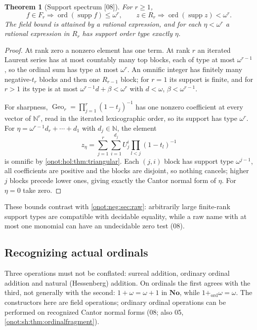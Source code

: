\documentclass[11pt,oneside]{article}
\numberwithin{equation}{section}
\newtheorem{theorem}{Theorem}[section]
\theoremstyle{definition}
\theoremstyle{remark}
\newcommand{\No}{\mathbf{No}}
\newcommand{\N}{\mathbb N}
\newcommand{\supp}{\operatorname{supp}}
\newcommand{\ord}{\operatorname{ord}}
\newcommand{\Geo}{\operatorname{Geo}}
\newcommand{\src}[1]{\textup{\textsf{\small[#1]}}}
\begin{document}
\begin{theorem}[Support spectrum \src{08}]\label{onot:hol:thm:support}
For $r\ge1$,
\[
 f\in F_r\Rightarrow\ord(\supp f)\le\omega^r,\qquad z\in R_r\Rightarrow\ord(\supp z)<\omega^r.
\]
The field bound is attained by a rational expression, and for each
$\eta<\omega^r$ a rational expression in $R_r$ has support order type exactly
$\eta$.
\end{theorem}
\begin{proof}
At rank zero a nonzero element has one term. At rank $r$ an iterated Laurent
series has at most countably many top blocks, each of type at most
$\omega^{r-1}$, so the ordinal sum has type at most $\omega^r$. An omnific
integer has finitely many negative-$t_r$ blocks and then one $R_{r-1}$ block; for
$r=1$ its support is finite, and for $r>1$ its type is at most
$\omega^{r-1}d+\beta<\omega^r$ with $d<\omega$, $\beta<\omega^{r-1}$.

For sharpness, $\Geo_r=\prod_{j=1}^r(1-t_j)^{-1}$ has one nonzero coefficient at
every vector of $\N^r$, read in the iterated lexicographic order, so its support
has type $\omega^r$. For $\eta=\omega^{r-1}d_r+\cdots+d_1$ with $d_j\in\N$, the
element
\begin{equation}\label{onot:hol:eq:realizesupport}
 z_\eta=\sum_{j=1}^r\sum_{i=1}^{d_j}U_j^i\prod_{l<j}(1-t_l)^{-1}
\end{equation}
is omnific by \cref{onot:hol:thm:triangular}. Each $(j,i)$ block has support type
$\omega^{j-1}$, all coefficients are positive and the blocks are disjoint, so
nothing cancels; higher $j$ blocks precede lower ones, giving exactly the Cantor
normal form of $\eta$. For $\eta=0$ take zero.
\end{proof}

These bounds contrast with \cref{onot:neg:sec:raw}: arbitrarily large finite-rank
support types are compatible with decidable equality, while a raw name with at
most one monomial can have an undecidable zero test (08).

\subsection{Recognizing actual ordinals}

Three operations must not be conflated: surreal addition, ordinary ordinal
addition and natural (Hessenberg) addition. On ordinals the first agrees with the
third, not generally with the second: $1+\omega=\omega+1$ in $\No$, while
$1+_{\mathrm{ord}}\omega=\omega$. The constructors here are field operations;
ordinary ordinal operations can be performed on recognized Cantor normal forms
(08; also 05, \cref{onot:sh:thm:ordinalfragment}).
\end{document}
